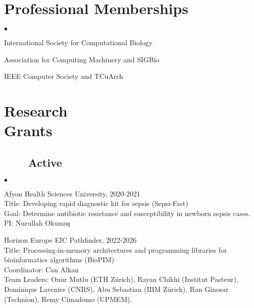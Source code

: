 \documentclass[margin,line]{res}
\newenvironment{list2}{
  \begin{list}{$\bullet$}{%
      \setlength{\itemsep}{0.1cm}
      \setlength{\parsep}{0in} \setlength{\parskip}{0in}
      \setlength{\topsep}{0in} \setlength{\partopsep}{0in} 
      \setlength{\leftmargin}{0.2in}}}{\end{list}}
\newenvironment{list4}{
  \begin{list}{$\bullet$}{%
      \setlength{\itemsep}{0cm}
      \setlength{\parsep}{0in} \setlength{\parskip}{0in}
      \setlength{\topsep}{0in} \setlength{\partopsep}{0in} 
      \setlength{\leftmargin}{0.2in}}}{\end{list}}
\begin{document}
\begin{resume}
\vspace*{-.2cm}
\section{\sc Professional Memberships}
\begin{list4}
\item 
  International Society for Computational Biology%
\item
  Association for Computing Machinery and SIGBio
\item
  IEEE Computer Society and TCuArch
\end{list4}


          \section{\sc Research \\ Grants}
                                       \vspace{-0.4cm}
                                       \subsection{\small \sc ~~~~Active}
  \begin{list2}
    \item
        Afyon Health Sciences University, 2020-2021\\
        Title: Developing rapid diagnostic kit for sepsis (Sepsi-Fast)\\
        Goal: Determine antibiotic resistance and susceptibility in newborn sepsis cases.\\
        PI: Nurullah Okumuş
    \item
    Horizon Europe EIC Pathfinder, 2022-2026\\
    Title: Processing-in-memory architectures and programming libraries for bioinformatics algorithms (BioPIM)\\
    Coordinator: Can Alkan\\
    Team Leaders: Onur Mutlu (ETH Zürich), Rayan Chikhi (Institut Pasteur), Dominique Lavenier (CNRS), Abu Sebastian (IBM Zürich), Ran Ginosar (Technion), Remy Cimadomo (UPMEM).
  \end{list2}


\vspace{-0.5cm}

\end{resume}
\end{document}
